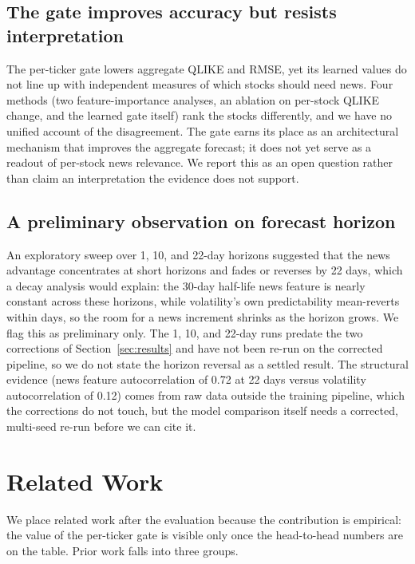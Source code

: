 \documentclass[runningheads]{llncs}
\begin{document}
\subsection{The gate improves accuracy but resists interpretation}
The per-ticker gate lowers aggregate QLIKE and RMSE, yet its learned values do not line up with
independent measures of which stocks should need news. Four methods (two feature-importance
analyses, an ablation on per-stock QLIKE change, and the learned gate itself) rank the stocks
differently, and we have no unified account of the disagreement. The gate earns its place as an
architectural mechanism that improves the aggregate forecast; it does not yet serve as a readout of
per-stock news relevance. We report this as an open question rather than claim an interpretation the
evidence does not support.

\subsection{A preliminary observation on forecast horizon}
An exploratory sweep over 1, 10, and 22-day horizons suggested that the news advantage concentrates
at short horizons and fades or reverses by 22 days, which a decay analysis would explain: the
30-day half-life news feature is nearly constant across these horizons, while volatility's own
predictability mean-reverts within days, so the room for a news increment shrinks as the horizon
grows. We flag this as preliminary only. The 1, 10, and 22-day runs predate the two corrections of
Section~\ref{sec:results} and have not been re-run on the corrected pipeline, so we do not state the
horizon reversal as a settled result. The structural evidence (news feature autocorrelation of 0.72
at 22 days versus volatility autocorrelation of 0.12) comes from raw data outside the training
pipeline, which the corrections do not touch, but the model comparison itself needs a
corrected, multi-seed re-run before we can cite it.

\section{Related Work}
\label{sec:related}

We place related work after the evaluation because the contribution is empirical: the value of the
per-ticker gate is visible only once the head-to-head numbers are on the table. Prior work falls
into three groups.
\end{document}
